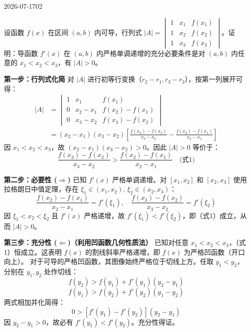 \begin{mistake}{2026-07-17}{02}

\begin{problemcontent}
设函数 \(f(x)\) 在区间 \((a,b)\) 内可导，行列式 \(|A| = \begin{vmatrix} 1 & x_1 & f(x_1) \\ 1 & x_2 & f(x_2) \\ 1 & x_3 & f(x_3) \end{vmatrix}\)。证明：导函数 \(f'(x)\) 在 \((a,b)\) 内严格单调递增的充分必要条件是对 \((a,b)\) 内任意的 \(x_1 < x_2 < x_3\)，有 \(|A| > 0\)。
\end{problemcontent}

\begin{solutioncontent}
\textbf{第一步：行列式化简}
对 \(|A|\) 进行初等行变换（\(r_2 - r_1, r_3 - r_2\)），按第一列展开可得：
\[
\begin{aligned}
|A| &= \begin{vmatrix} 1 & x_1 & f(x_1) \\ 0 & x_2-x_1 & f(x_2)-f(x_1) \\ 0 & x_3-x_2 & f(x_3)-f(x_2) \end{vmatrix} \\
    &= (x_2-x_1)(x_3-x_2) \left[ \frac{f(x_3)-f(x_2)}{x_3-x_2} - \frac{f(x_2)-f(x_1)}{x_2-x_1} \right]
\end{aligned}
\]
因 \(x_1 < x_2 < x_3\)，故 \((x_2-x_1)(x_3-x_2) > 0\)。因此 \(|A| > 0\) 等价于：
\[ \frac{f(x_3)-f(x_2)}{x_3-x_2} > \frac{f(x_2)-f(x_1)}{x_2-x_1} \quad \text{(式1)} \]

\textbf{第二步：必要性 (\(\Rightarrow\))}
已知 \(f'(x)\) 严格单调递增。对 \([x_1, x_2]\) 和 \([x_2, x_3]\) 使用拉格朗日中值定理，存在 \(\xi_1 \in (x_1, x_2)\), \(\xi_2 \in (x_2, x_3)\)：
\[ \frac{f(x_2)-f(x_1)}{x_2-x_1} = f'(\xi_1), \quad \frac{f(x_3)-f(x_2)}{x_3-x_2} = f'(\xi_2) \]
因 \(\xi_1 < x_2 < \xi_2\) 且 \(f'(x)\) 严格递增，故 \(f'(\xi_1) < f'(\xi_2)\)，即（式1）成立，从而 \(|A| > 0\)。

\textbf{第三步：充分性 (\(\Leftarrow\))（利用凹函数几何性质法）}
已知对任意 \(x_1 < x_2 < x_3\)，（式1）恒成立。这表明 \(f(x)\) 的割线斜率严格递增，即 \(f(x)\) 为严格凹函数（开口向上）。
对于可导的严格凹函数，其图像始终严格位于切线上方。任取 \(y_1 < y_2\)，分别在 \(y_1, y_2\) 处作切线：
\[ f(y_2) > f(y_1) + f'(y_1)(y_2 - y_1) \]
\[ f(y_1) > f(y_2) + f'(y_2)(y_1 - y_2) \]
两式相加并化简得：
\[ 0 > [f'(y_1) - f'(y_2)](y_2 - y_1) \]
因 \(y_2 - y_1 > 0\)，故必有 \(f'(y_1) < f'(y_2)\)。充分性得证。
\end{solutioncontent}


\end{mistake}
